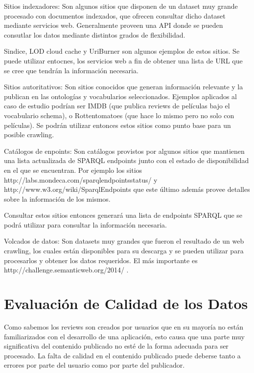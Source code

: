 Sitios indexadores: Son algunos sitios que disponen de un dataset muy grande procesado con documentos indexados, que ofrecen consultar dicho 
dataset mediante servicios web. Generalmente proveen una API donde se pueden consutlar los datos mediante distintos grados de flexibilidad.

Sindice, LOD cloud cache y UriBurner son algunos ejemplos de estos sitios. Se puede utilizar entocnes, los servicios web a fin
de obtener una lista de URL que se cree que tendrán la información necesaria.

Sitios autoritativos: Son sitios conocidos que generan información relevante y la publican en las ontologías y vocabularios 
seleccionados. Ejemplos aplicados al caso de estudio podrían ser IMDB (que publica reviews de películas bajo el vocabulario schema), o Rottentomatoes
(que hace lo mismo pero no solo con películas). Se podrán utilizar entonces estos sitios como punto base para un posible crawling.

Catálogos de enpoints: Son catálogos provistos por algunos sitios que mantienen una lista actualizada de SPARQL endpoints 
junto con el estado de disponibilidad en el que se encuentran. Por ejemplo los sitios http://labs.mondeca.com/sparqlendpointsstatus/ y 
http://www.w3.org/wiki/SparqlEndpoints que este último además provee detalles sobre la información de los mismos.

Consultar estos sitios entonces generará una lista de endpoints SPARQL que se podrá utilizar para consultar la información necesaria.

Volcados de datos: Son datasets muy grandes que fueron el resultado de un web crawling, los cuales están disponibles para su descarga 
y se pueden utilizar para procesarlos y obtener los datos requeridos. El más importante es http://challenge.semanticweb.org/2014/ .

%

 

\section{Evaluación de Calidad de los Datos} 
Como sabemos los reviews son creados por usuarios que en su mayoría no están familiarizados con el desarrollo de una 
aplicación, esto causa que una parte muy significativa del contenido publicado no esté de la forma adecuada para ser procesado. 
La falta de calidad en el contenido publicado puede deberse tanto a errores por parte del usuario como por parte del publicador.


